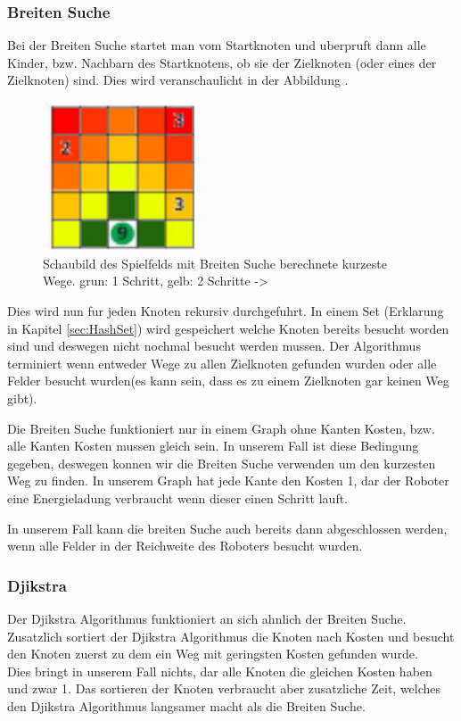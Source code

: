 \documentclass[a4paper,12pt,arial]{scrartcl}
\begin{document}
\subsubsection{Breiten Suche}
Bei der Breiten Suche startet man vom Startknoten und uberpruft dann alle Kinder, bzw. Nachbarn des Startknotens, ob sie der Zielknoten (oder eines der Zielknoten) sind.
Dies wird veranschaulicht in der Abbildung .
\begin{figure}[h!]
    \centering
    \includegraphics[width=0.4\textwidth]{Stromrallye_Feld_BFS.pdf}
    \caption{Schaubild des Spielfelds mit Breiten Suche berechnete kurzeste Wege. grun: 1 Schritt, gelb: 2 Schritte -> \textcite{bwinfSpielfeld}}
    \label{fig:bfs_stromrallye}
\end{figure}
Dies wird nun fur jeden Knoten rekursiv durchgefuhrt.
In einem Set (Erklarung in Kapitel \ref{sec:HashSet}) wird gespeichert welche Knoten bereits besucht worden sind und deswegen nicht nochmal besucht werden mussen.
Der Algorithmus terminiert wenn entweder Wege zu allen Zielknoten gefunden wurden oder alle Felder besucht wurden(es kann sein, dass es zu einem Zielknoten gar keinen Weg gibt).

Die Breiten Suche funktioniert nur in einem Graph ohne Kanten Kosten, bzw. alle Kanten Kosten mussen gleich sein. In unserem Fall ist diese Bedingung gegeben, deswegen konnen wir die Breiten Suche verwenden um den kurzesten Weg zu finden.
In unserem Graph hat jede Kante den Kosten 1, dar der Roboter eine Energieladung verbraucht wenn dieser einen Schritt lauft.
\par
In unserem Fall kann die breiten Suche auch bereits dann abgeschlossen werden, wenn alle Felder in der Reichweite des Roboters besucht wurden.
\subsubsection{Djikstra}
Der Djikstra Algorithmus funktioniert an sich ahnlich der Breiten Suche. Zusatzlich sortiert der Djikstra Algorithmus die Knoten nach Kosten und besucht den Knoten zuerst zu dem ein Weg mit geringsten Kosten gefunden wurde.
\\
Dies bringt in unserem Fall nichts, dar alle Knoten die gleichen Kosten haben und zwar 1. Das sortieren der Knoten verbraucht aber zusatzliche Zeit, welches den Djikstra Algorithmus langsamer macht als die Breiten Suche.
\end{document}
